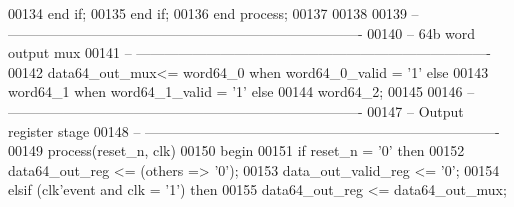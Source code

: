 \begin{DoxyCode}
00134       \textcolor{keywordflow}{end} \textcolor{keywordflow}{if};
00135    \textcolor{keywordflow}{end} \textcolor{keywordflow}{if};
00136 \textcolor{keywordflow}{end} \textcolor{keywordflow}{process};
00137 
00138 
00139 \textcolor{keyword}{-- ----------------------------------------------------------------------------}
00140 \textcolor{keyword}{-- 64b word output mux}
00141 \textcolor{keyword}{-- ----------------------------------------------------------------------------}
00142 \textcolor{vhdlchar}{data64_out_mux}\textcolor{vhdlchar}{<=}  \textcolor{vhdlchar}{word64_0} \textcolor{keywordflow}{when} \textcolor{vhdlchar}{word64_0_valid} \textcolor{vhdlchar}{=} \textcolor{vhdlchar}{'}\textcolor{vhdllogic}{}\textcolor{vhdllogic}{1}\textcolor{vhdlchar}{'} \textcolor{keywordflow}{else} 
00143                   \textcolor{vhdlchar}{word64_1} \textcolor{keywordflow}{when} \textcolor{vhdlchar}{word64_1_valid} \textcolor{vhdlchar}{=} \textcolor{vhdlchar}{'}\textcolor{vhdllogic}{}\textcolor{vhdllogic}{1}\textcolor{vhdlchar}{'} \textcolor{keywordflow}{else}
00144                   \textcolor{vhdlchar}{word64_2};
00145 
00146 \textcolor{keyword}{-- ----------------------------------------------------------------------------}
00147 \textcolor{keyword}{-- Output register stage}
00148 \textcolor{keyword}{-- ----------------------------------------------------------------------------                  }
00149 \textcolor{keywordflow}{process}(reset_n, clk)
00150 \textcolor{vhdlkeyword}{begin}
00151    \textcolor{keywordflow}{if} \textcolor{vhdlchar}{reset_n} \textcolor{vhdlchar}{=} \textcolor{vhdlchar}{'}\textcolor{vhdllogic}{}\textcolor{vhdllogic}{0}\textcolor{vhdlchar}{'} \textcolor{keywordflow}{then}
00152       \textcolor{vhdlchar}{data64_out_reg}       \textcolor{vhdlchar}{<=} \textcolor{vhdlchar}{(}\textcolor{keywordflow}{others} \textcolor{vhdlchar}{=}\textcolor{vhdlchar}{>} \textcolor{vhdlchar}{'}\textcolor{vhdllogic}{}\textcolor{vhdllogic}{0}\textcolor{vhdlchar}{'}\textcolor{vhdlchar}{)};
00153       \textcolor{vhdlchar}{data_out_valid_reg}   \textcolor{vhdlchar}{<=} \textcolor{vhdlchar}{'}\textcolor{vhdllogic}{}\textcolor{vhdllogic}{0}\textcolor{vhdlchar}{'};        
00154    \textcolor{keywordflow}{elsif} \textcolor{vhdlchar}{(}\textcolor{vhdlchar}{clk}\textcolor{vhdlchar}{'}\textcolor{vhdlkeyword}{event} \textcolor{keywordflow}{and} \textcolor{vhdlchar}{clk} \textcolor{vhdlchar}{=} \textcolor{vhdlchar}{'}\textcolor{vhdllogic}{}\textcolor{vhdllogic}{1}\textcolor{vhdlchar}{'}\textcolor{vhdlchar}{)} \textcolor{keywordflow}{then}
00155       \textcolor{vhdlchar}{data64_out_reg}     \textcolor{vhdlchar}{<=} \textcolor{vhdlchar}{data64_out_mux}; 

\end{DoxyCode}
